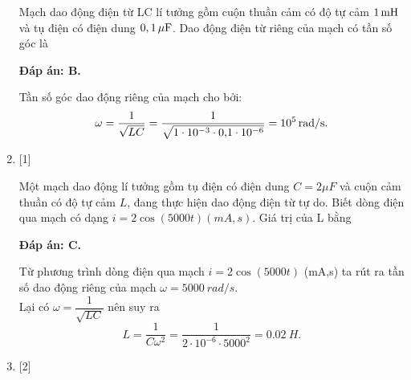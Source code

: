 \begin{enumerate}[label=\bfseries Câu \arabic*:]
	\cauhoi
	{Mạch dao động điện từ LC lí tưởng gồm cuộn thuần cảm có độ tự cảm $\xsi{1}{mH}$ và tụ điện có điện dung $\xsi{0,1}{\mu F}$. Dao động điện từ riêng của mạch có tần số góc là
	}
	
	\loigiai
	{		\textbf{Đáp án: B.}
		
		Tần số góc dao động riêng của mạch cho bởi:
		$$\omega = \dfrac{1}{\sqrt{LC}} = \dfrac{1}{\sqrt{1\cdot10^{-3}\cdot \text{0,1}\cdot10^{-6}}} = \xsi{10^{5}}{rad/s}.$$
		
	}

	\item {} [1] %
	
	\cauhoi
	{Một mạch dao động lí tưởng gồm tụ điện có điện dung $C = 2 \mu F$ và cuộn cảm thuần có độ tự cảm $L$, đang thực hiện dao động điện từ tự do. Biết dòng điện qua mạch có dạng $i = 2 \cos \left( 5000t \right)(mA,s)$. Giá trị của L bằng
	}
	
	\loigiai
	{		\textbf{Đáp án: C.}
		
		Từ phương trình dòng điện qua mạch $i = 2 \cos \left( 5000t \right)$ (mA,s) ta rút ra tần số dao động riêng của mạch $\omega = \SI{5000}{rad/s}$. \\
		Lại có $\omega = \dfrac{1}{\sqrt{LC}}$ nên suy ra 
		$$L = \dfrac{1}{C \omega^2} = \dfrac{1}{2\cdot10^{-6} \cdot 5000^2} = \SI{0,02}{H}.$$ 
		
	}

	\item {} [2] %
	

\end{enumerate}
